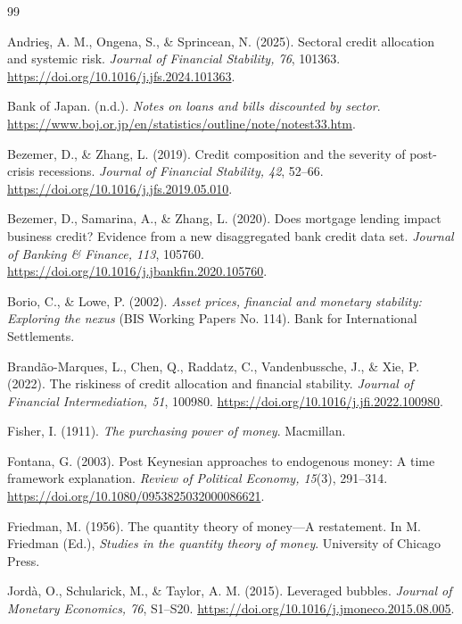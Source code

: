 \documentclass[11pt]{article}
\begin{document}
\begin{thebibliography}{99}

Andrie{\c{s}}, A. M., Ongena, S., \& Sprincean, N. (2025).
Sectoral credit allocation and systemic risk.
\emph{Journal of Financial Stability, 76}, 101363.
\url{https://doi.org/10.1016/j.jfs.2024.101363}.

Bank of Japan. (n.d.).
\emph{Notes on loans and bills discounted by sector}.
\url{https://www.boj.or.jp/en/statistics/outline/note/notest33.htm}.

Bezemer, D., \& Zhang, L. (2019).
Credit composition and the severity of post-crisis recessions.
\emph{Journal of Financial Stability, 42}, 52--66.
\url{https://doi.org/10.1016/j.jfs.2019.05.010}.

Bezemer, D., Samarina, A., \& Zhang, L. (2020).
Does mortgage lending impact business credit? Evidence from a new
disaggregated bank credit data set.
\emph{Journal of Banking \& Finance, 113}, 105760.
\url{https://doi.org/10.1016/j.jbankfin.2020.105760}.

Borio, C., \& Lowe, P. (2002).
\emph{Asset prices, financial and monetary stability: Exploring the nexus}
(BIS Working Papers No. 114). Bank for International Settlements.

Brand{\~a}o-Marques, L., Chen, Q., Raddatz, C., Vandenbussche, J., \& Xie, P.
(2022). The riskiness of credit allocation and financial stability.
\emph{Journal of Financial Intermediation, 51}, 100980.
\url{https://doi.org/10.1016/j.jfi.2022.100980}.

Fisher, I. (1911).
\emph{The purchasing power of money}. Macmillan.

Fontana, G. (2003).
Post Keynesian approaches to endogenous money: A time framework explanation.
\emph{Review of Political Economy, 15}(3), 291--314.
\url{https://doi.org/10.1080/0953825032000086621}.

Friedman, M. (1956).
The quantity theory of money---A restatement.
In M. Friedman (Ed.), \emph{Studies in the quantity theory of money}.
University of Chicago Press.

Jord{\`a}, O., Schularick, M., \& Taylor, A. M. (2015).
Leveraged bubbles.
\emph{Journal of Monetary Economics, 76}, S1--S20.
\url{https://doi.org/10.1016/j.jmoneco.2015.08.005}.


\end{thebibliography}
\end{document}
